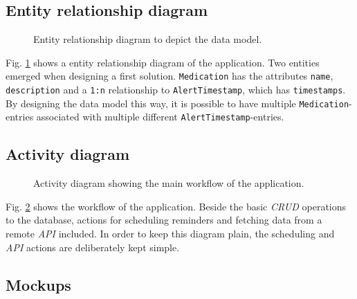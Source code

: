 \documentclass[conference]{IEEEtran}
\begin{document}
\subsection{Entity relationship diagram}

\begin{figure}[H]
	\centerline{}
	\caption{Entity relationship diagram to depict the data model.}
	\label{fig:entity_relationship_diagram}
\end{figure}

Fig. \ref{fig:entity_relationship_diagram} shows a entity relationship diagram of the application.
Two entities emerged when designing a first solution. \texttt{Medication} has the attributes \texttt{name},
\texttt{description} and a \texttt{1:n} relationship to \texttt{AlertTimestamp}, which has \texttt{timestamps}.
By designing the data model this way, it is possible to have multiple \texttt{Medication}-entries associated with multiple different \texttt{AlertTimestamp}-entries.

\subsection{Activity diagram}

\begin{figure}[H]
	\centerline{}
	\caption{Activity diagram showing the main workflow of the application.}
	\label{fig:activity_diagram}
\end{figure}

Fig. \ref{fig:activity_diagram} shows the workflow of the application. Beside the basic \textit{CRUD} operations
to the database, actions for scheduling reminders and fetching data from a remote \textit{API} included. In order
to keep this diagram plain, the scheduling and \textit{API} actions are deliberately kept simple.

\subsection{Mockups} \label{sec:mockups}
\end{document}
